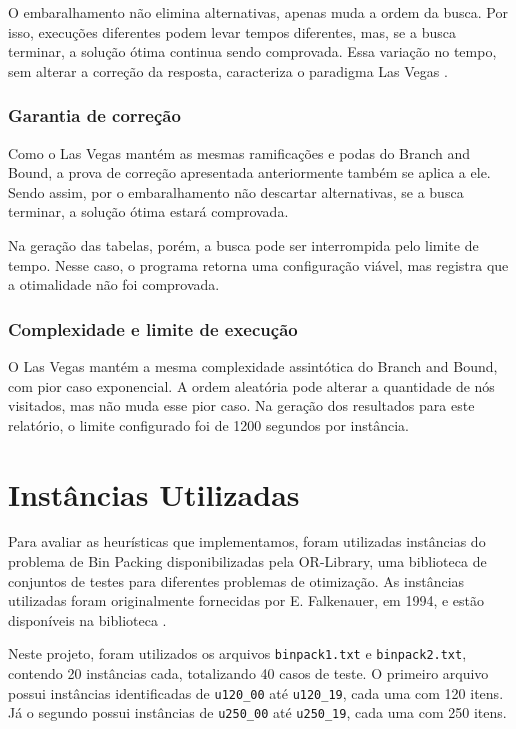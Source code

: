 \documentclass[12pt]{article}
\begin{document}
O embaralhamento não elimina alternativas, apenas muda a ordem da busca. Por isso, execuções diferentes podem levar tempos diferentes, mas, se a busca terminar, a solução ótima continua sendo comprovada. Essa variação no tempo, sem alterar a correção da resposta, caracteriza o paradigma Las Vegas \cite{figueiredo2007}.

\subsubsection{Garantia de correção}

Como o Las Vegas mantém as mesmas ramificações e podas do Branch and Bound, a prova de correção apresentada anteriormente também se aplica a ele. Sendo assim, por o embaralhamento não descartar alternativas, se a busca terminar, a solução ótima estará comprovada.

Na geração das tabelas, porém, a busca pode ser interrompida pelo limite de tempo. Nesse caso, o programa retorna uma configuração viável, mas registra que a otimalidade não foi comprovada.

\subsubsection{Complexidade e limite de execução}

O Las Vegas mantém a mesma complexidade assintótica do Branch and Bound, com pior caso exponencial. A ordem aleatória pode alterar a quantidade de nós visitados, mas não muda esse pior caso. Na geração dos resultados para este relatório, o limite configurado foi de 1200 segundos por instância.

\section{Instâncias Utilizadas}

Para avaliar as heurísticas que implementamos, foram utilizadas instâncias do problema de Bin Packing disponibilizadas pela OR-Library, uma biblioteca de conjuntos de testes para diferentes problemas de otimização. As instâncias utilizadas foram originalmente fornecidas por E. Falkenauer, em 1994, e estão disponíveis na biblioteca \cite{orlibrary}.

Neste projeto, foram utilizados os arquivos \texttt{binpack1.txt} e \texttt{binpack2.txt}, contendo 20 instâncias cada, totalizando 40 casos de teste. O primeiro arquivo possui instâncias identificadas de \texttt{u120\_00} até \texttt{u120\_19}, cada uma com 120 itens. Já o segundo possui instâncias de \texttt{u250\_00} até \texttt{u250\_19}, cada uma com 250 itens.
\end{document}
